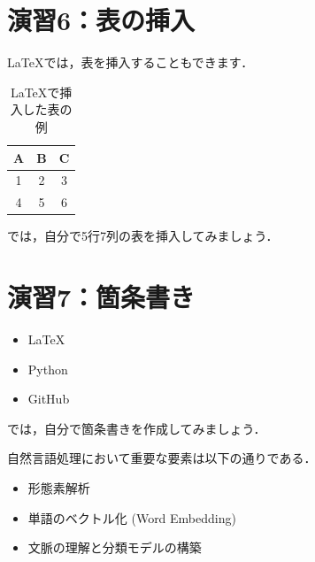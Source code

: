 \documentclass[a4paper,twocolumn]{jsarticle}
\begin{document}
\section*{演習6：表の挿入}
LaTeXでは，表を挿入することもできます．

\begin{table}[H]
    \centering
    \begin{tabular}{|c|c|c|}
        \hline
        A & B & C \\
        \hline
        1 & 2 & 3 \\
        4 & 5 & 6 \\
        \hline
    \end{tabular}
    \caption{LaTeXで挿入した表の例}
    \label{tab:practice}
\end{table}

では，自分で5行7列の表を挿入してみましょう．

\begin{table}[H]
    \centering
    \caption{各モデルのハイパーパラメータと評価指標の比較}
    \label{tab:model_comparison}
\end{table}

\section*{演習7：箇条書き}
\begin{itemize}
    \item LaTeX
    \item Python
    \item GitHub
\end{itemize}

では，自分で箇条書きを作成してみましょう．

自然言語処理において重要な要素は以下の通りである．
\begin{itemize}
    \item 形態素解析
    \item 単語のベクトル化 (Word Embedding)
    \item 文脈の理解と分類モデルの構築
\end{itemize}
\end{document}
